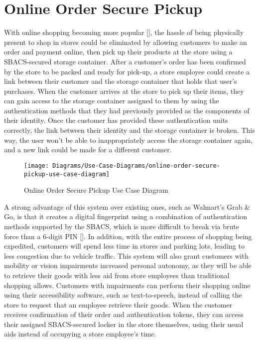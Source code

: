 \documentclass[12pt]{report}
\begin{document}
\section{Online Order Secure Pickup}

With online shopping becoming more popular [], the hassle of being physically present to shop in stores 
could be eliminated by allowing customers to make an order and payment online, then pick up their products at the store 
using a SBACS-secured storage container. After a customer's order has been confirmed by the store to be packed 
and ready for pick-up, a store employee could create a link between their customer and the storage container that holds
that user's purchases. When the customer arrives at the store to pick up their items, 
they can gain access to the storage container assigned to them by using the authentication methods that they had
previously provided as the components of their identity. Once the customer has provided these authentication units
correctly, the link between their identity and the storage container is broken. This way, the user won't be able to
inappropriately access the storage container again, and a new link could be made for a different customer.

\begin{figure}
	\texttt{[image: Diagrams/Use-Case-Diagrams/online-order-secure-pickup-use-case-diagram]}
	\caption{Online Order Secure Pickup Use Case Diagram}
	\label{fig:online-order-secure-pickup-use-case}
\end{figure}

A strong advantage of this system over existing ones, such as Walmart's Grab \& Go, is that it creates a digital 
fingerprint using a combination of authentication methods supported by the SBACS, which is more difficult to 
break via brute force than a 6-digit PIN []. In addition, with the entire process of shopping being 
expedited, customers will spend less time in stores and parking lots, leading to less congestion due to vehicle 
traffic. This system will also grant customers with mobility or vision impairments increased personal autonomy, as 
they will be able to retrieve their goods with less aid from store employees than traditional shopping allows. Customers
with impairments can perform their shopping online using their accessibility software, such as text-to-speech, instead 
of calling the store to request that an employee retrieve their goods. When the customer receives confirmation of their 
order and authentication tokens, they can access their assigned SBACS-secured locker in the store themselves, using 
their usual aids instead of occupying a store employee's time.
\end{document}
